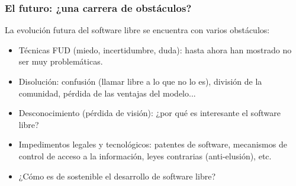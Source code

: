 \documentclass{beamer}
\begin{document}
\begin{frame}
\frametitle{El futuro: ¿una carrera de obstáculos?}

La evolución futura del software libre se encuentra con varios
obstáculos:

\begin{itemize}
\item Técnicas FUD (miedo, incertidumbre, duda): hasta ahora han mostrado no ser muy problemáticas.
\item Disolución: confusión (llamar libre a lo que no lo es), división de la comunidad, pérdida de las
ventajas del modelo...
\item Desconocimiento (pérdida de visión): ¿por qué es interesante el software libre?
\item Impedimentos legales y tecnológicos: patentes de software, mecanismos de
control de acceso a la información, leyes contrarias (anti-elusión), etc.
\item ¿Cómo es de sostenible el desarrollo de software libre?
\end{itemize}

\end{frame}


\end{document}
